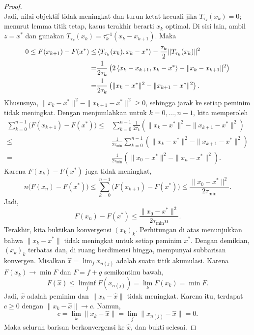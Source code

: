 \begin{proof}
\begin{equation}
    \end{equation}
    Jadi, nilai objektif tidak meningkat dan turun ketat kecuali jika \(T_{\tau_k}(x_k)=0\); menurut lemma titik tetap, kasus terakhir berarti \(x_k\) optimal. Di sisi lain, ambil \(z=x^*\) dan gunakan \(T_{\tau_k}(x_k)=\tau_k^{-1}(x_k-x_{k+1})\). Maka
    \begin{equation}
        \begin{aligned}
            0\leq F(x_{k+1})-F(x^*)
            \leq&\left\langle T_{\tau_k}(x_k) , x_k-x^*\right\rangle
                 -\frac{\tau_k}{2}\|T_{\tau_k}(x_k)\|^2\\
            =&\frac{1}{2\tau_k}
              \left(2\left\langle x_k-x_{k+1} , x_k-x^*\right\rangle
                    -\|x_k-x_{k+1}\|^2\right)\\
            =&\frac{1}{2\tau_k}
              \left(\|x_k-x^*\|^2-\|x_{k+1}-x^*\|^2\right).
        \end{aligned}
    \end{equation}
    Khususnya, \(\|x_k-x^*\|^2-\|x_{k+1}-x^*\|^2\geq0\), sehingga jarak ke setiap peminim tidak meningkat. Dengan menjumlahkan untuk \(k=0,\dots,n-1\), kita memperoleh
    \begin{equation}
        \begin{aligned}
            \sum_{k=0}^{n-1}\bigl(F(x_{k+1})-F(x^*)\bigr)
            \leq&\sum_{k=0}^{n-1}\frac{1}{2\tau_k}
              \left(\|x_k-x^*\|^2-\|x_{k+1}-x^*\|^2\right)\\
            \leq&\frac{1}{2\tau_{\min}}\sum_{k=0}^{n-1}
              \left(\|x_k-x^*\|^2-\|x_{k+1}-x^*\|^2\right)\\
            =&\frac{1}{2\tau_{\min}}
              \left(\|x_0-x^*\|^2-\|x_n-x^*\|^2\right).
        \end{aligned}
    \end{equation}
    Karena \(F(x_k)-F(x^*)\) juga tidak meningkat,
    \begin{equation}
        n\bigl(F(x_n)-F(x^*)\bigr)
        \leq\sum_{k=0}^{n-1}\bigl(F(x_{k+1})-F(x^*)\bigr)
        \leq\frac{\|x_0-x^*\|^2}{2\tau_{\min}}.
    \end{equation}
    Jadi,
    \begin{equation}
        F(x_n)-F(x^*)\leq
        \frac{\|x_0-x^*\|^2}{2\tau_{\min}n}.
    \end{equation}
    Terakhir, kita buktikan konvergensi \((x_k)_k\). Perhitungan di atas menunjukkan bahwa \(\|x_k-x^*\|\) tidak meningkat untuk setiap peminim \(x^*\). Dengan demikian, \((x_k)_k\) terbatas dan, di ruang berdimensi hingga, mempunyai subbarisan konvergen.
    Misalkan \(\hat x=\lim_jx_{n(j)}\) adalah suatu titik akumulasi. Karena \(F(x_k)\rightarrow\min F\) dan \(F=f+g\) semikontinu bawah,
    \[
        F(\hat x)\leq\liminf_jF(x_{n(j)})=\lim_kF(x_k)=\min F.
    \]
    Jadi, \(\hat x\) adalah peminim dan \(\|x_k-\hat x\|\) tidak meningkat. Karena itu, terdapat \(c\geq0\) dengan \(\|x_k-\hat x\|\rightarrow c\). Namun,
    \begin{equation}
        c=\lim_k\|x_k-\hat x\|
         =\lim_j\|x_{n(j)}-\hat x\|=0.
    \end{equation}
    Maka seluruh barisan berkonvergensi ke \(\hat x\), dan bukti selesai.
\end{proof}
